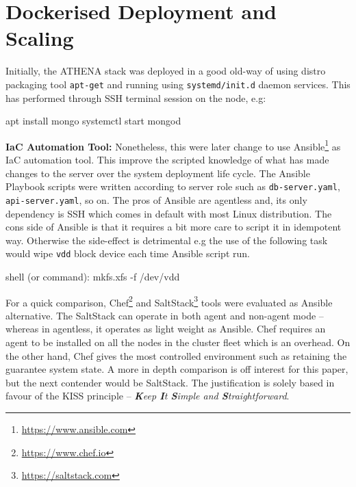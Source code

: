 \section{Dockerised Deployment and Scaling}

Initially, the ATHENA stack was deployed in a good old-way of using distro packaging tool \verb|apt-get| and running using \verb|systemd/init.d| daemon services. This has performed through SSH terminal session on the node, e.g:

\begin{small}
\begin{lcverbatim}
apt install mongo
systemctl start mongod
\end{lcverbatim}
\end{small}

\noindent \textbf{IaC Automation Tool:} \quad Nonetheless, this were later change to use Ansible\footnote{\url{https://www.ansible.com}} as IaC automation tool. This improve the scripted knowledge of what has made changes to the server over the system deployment life cycle. The Ansible Playbook scripts were written according to server role such as \verb|db-server.yaml|, \verb|api-server.yaml|, so on. The pros of Ansible are agentless and, its only dependency is SSH which comes in default with most Linux distribution. The cons side of Ansible is that it requires a bit more care to script it in idempotent way. Otherwise the side-effect is detrimental e.g the use of the following task would wipe \verb|vdd| block device each time Ansible script run.

\begin{small}
\begin{lcverbatim}
shell (or command): mkfs.xfs -f /dev/vdd
\end{lcverbatim}
\end{small}
 
For a quick comparison, Chef\footnote{\url{https://www.chef.io}} and SaltStack\footnote{\url{https://saltstack.com}} tools were evaluated as Ansible alternative. The SaltStack can operate in both agent and non-agent mode -- whereas in agentless, it operates as light weight as Ansible. Chef requires an agent to be installed on all the nodes in the cluster fleet which is an overhead. On the other hand, Chef gives the most controlled environment such as retaining the guarantee system state. A more in depth comparison is off interest for this paper, but the next contender would be SaltStack. The justification is solely based in favour of the KISS principle -- \textit{\textbf{K}eep \textbf{I}t \textbf{S}imple and \textbf{S}traightforward}.

